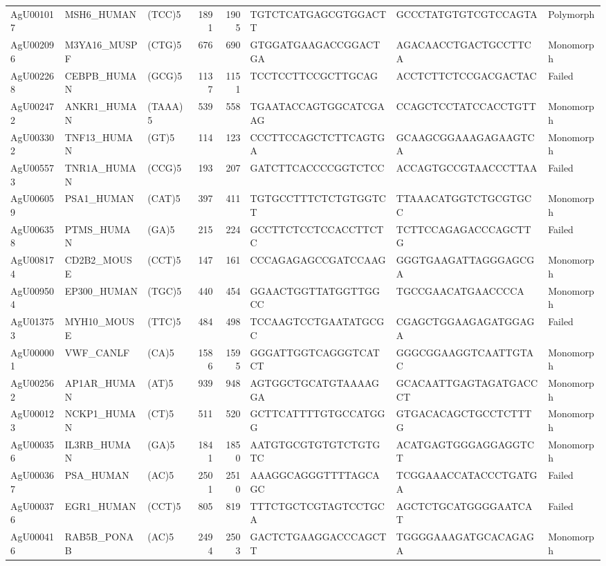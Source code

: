 \documentclass[]{article}
\begin{document}
\begin{longtable}[t]{lllrrlll}
AgU001017 & MSH6\_HUMAN & (TCC)5 & 1891 & 1905 & TGTCTCATGAGCGTGGACTT & GCCCTATGTGTCGTCCAGTA & Polymorph\\
AgU002096 & M3YA16\_MUSPF & (CTG)5 & 676 & 690 & GTGGATGAAGACCGGACTGA & AGACAACCTGACTGCCTTCA & Monomorph\\
AgU002268 & CEBPB\_HUMAN & (GCG)5 & 1137 & 1151 & TCCTCCTTCCGCTTGCAG & ACCTCTTCTCCGACGACTAC & Failed\\
\addlinespace
AgU002472 & ANKR1\_HUMAN & (TAAA)5 & 539 & 558 & TGAATACCAGTGGCATCGAAG & CCAGCTCCTATCCACCTGTT & Monomorph\\
AgU003302 & TNF13\_HUMAN & (GT)5 & 114 & 123 & CCCTTCCAGCTCTTCAGTGA & GCAAGCGGAAAGAGAAGTCA & Monomorph\\
AgU005573 & TNR1A\_HUMAN & (CCG)5 & 193 & 207 & GATCTTCACCCCGGTCTCC & ACCAGTGCCGTAACCCTTAA & Failed\\
AgU006059 & PSA1\_HUMAN & (CAT)5 & 397 & 411 & TGTGCCTTTCTCTGTGGTCT & TTAAACATGGTCTGCGTGCC & Monomorph\\
AgU006358 & PTMS\_HUMAN & (GA)5 & 215 & 224 & GCCTTCTCCTCCACCTTCTC & TCTTCCAGAGACCCAGCTTG & Failed\\
\addlinespace
AgU008174 & CD2B2\_MOUSE & (CCT)5 & 147 & 161 & CCCAGAGAGCCGATCCAAG & GGGTGAAGATTAGGGAGCGA & Monomorph\\
AgU009504 & EP300\_HUMAN & (TGC)5 & 440 & 454 & GGAACTGGTTATGGTTGGCC & TGCCGAACATGAACCCCA & Monomorph\\
AgU013753 & MYH10\_MOUSE & (TTC)5 & 484 & 498 & TCCAAGTCCTGAATATGCGC & CGAGCTGGAAGAGATGGAGA & Failed\\
AgU000001 & VWF\_CANLF & (CA)5 & 1586 & 1595 & GGGATTGGTCAGGGTCATCT & GGGCGGAAGGTCAATTGTAC & Monomorph\\
AgU002562 & AP1AR\_HUMAN & (AT)5 & 939 & 948 & AGTGGCTGCATGTAAAAGGA & GCACAATTGAGTAGATGACCCT & Monomorph\\
\addlinespace
AgU000123 & NCKP1\_HUMAN & (CT)5 & 511 & 520 & GCTTCATTTTGTGCCATGGG & GTGACACAGCTGCCTCTTTG & Monomorph\\
AgU000356 & IL3RB\_HUMAN & (GA)5 & 1841 & 1850 & AATGTGCGTGTGTCTGTGTC & ACATGAGTGGGAGGAGGTCT & Monomorph\\
AgU000367 & PSA\_HUMAN & (AC)5 & 2501 & 2510 & AAAGGCAGGGTTTTAGCAGC & TCGGAAACCATACCCTGATGA & Failed\\
AgU000376 & EGR1\_HUMAN & (CCT)5 & 805 & 819 & TTTCTGCTCGTAGTCCTGCA & AGCTCTGCATGGGGAATCAT & Failed\\
AgU000416 & RAB5B\_PONAB & (AC)5 & 2494 & 2503 & GACTCTGAAGGACCCAGCTT & TGGGGAAAGATGCACAGAGA & Monomorph\\

\end{longtable}
\end{document}

